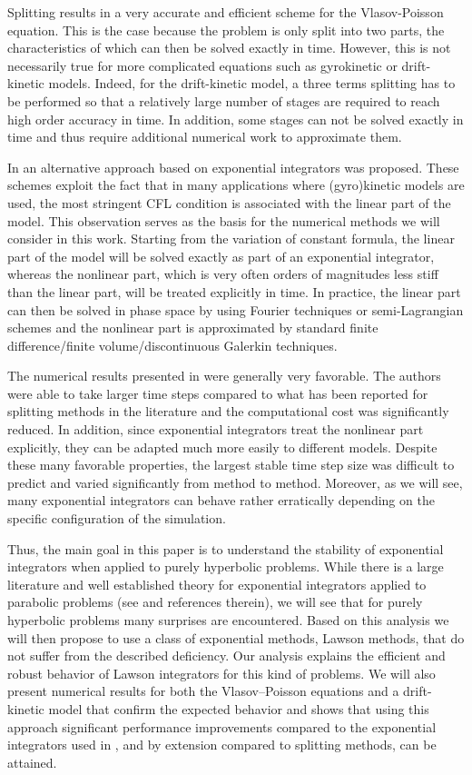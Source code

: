 Splitting results in a very accurate and efficient scheme for the Vlasov-Poisson equation. This is the case because the problem is only split into two parts, the characteristics of which can then be solved exactly in time.  However, this is not necessarily true for more complicated equations such as gyrokinetic or drift-kinetic models. Indeed, for the drift-kinetic model, a three terms splitting has to be performed so that a relatively large number of stages are required to reach high order accuracy in time.  In addition, some stages can not be solved exactly in time and thus require additional numerical work to approximate them.

In \cite{cep} an alternative approach based on exponential integrators was proposed. These schemes exploit the fact that in many applications where (gyro)kinetic models are used, the most stringent CFL condition is associated with the linear part of the model. This observation serves as the basis for the numerical methods we will consider in this work. Starting from the variation of constant formula, the linear part of the model will be solved exactly as part of an exponential integrator, whereas the nonlinear part, which is very often orders of magnitudes less stiff than the linear part, will be treated explicitly in time. In practice, the linear part can then be solved in phase space by using Fourier techniques or semi-Lagrangian schemes and the nonlinear part is approximated by standard finite difference/finite volume/discontinuous Galerkin techniques. 

The numerical results presented in \cite{cep} were generally very favorable. The authors were able to take larger time steps compared to what has been reported for splitting methods in the literature and the computational cost was significantly reduced. In addition, since exponential integrators treat the nonlinear part explicitly, they can be adapted much more easily to different models. Despite these many favorable properties, the largest stable time step size was difficult to predict and varied significantly from method to method. Moreover, as we will see, many exponential integrators can behave rather erratically depending on the specific configuration of the simulation.

Thus, the main goal in this paper is to understand the stability of exponential integrators when applied to purely hyperbolic problems. While there is a large literature and well established theory for exponential integrators applied to parabolic problems (see \cite{ei} and references therein), we will see that for purely hyperbolic problems many surprises are encountered. Based on this analysis we will then propose to use a class of exponential methods, Lawson methods, that do not suffer from the described deficiency. Our analysis explains the efficient and robust behavior of Lawson integrators for this kind of problems. We will also present numerical results for both the Vlasov--Poisson equations and a drift-kinetic model that confirm the expected behavior and shows that using this approach significant performance improvements compared to the exponential integrators used in \cite{cep}, and by extension compared to splitting methods, can be attained.

